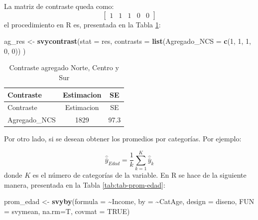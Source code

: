 \documentclass[
  spanish,
  12pt,
]{book}
\newenvironment{Shaded}{\begin{snugshade}}{\end{snugshade}}
\newcommand{\AttributeTok}[1]{\textcolor[rgb]{0.13,0.29,0.53}{#1}}
\newcommand{\ConstantTok}[1]{\textcolor[rgb]{0.56,0.35,0.01}{#1}}
\newcommand{\DecValTok}[1]{\textcolor[rgb]{0.00,0.00,0.81}{#1}}
\newcommand{\FunctionTok}[1]{\textcolor[rgb]{0.13,0.29,0.53}{\textbf{#1}}}
\newcommand{\NormalTok}[1]{#1}
\newcommand{\OtherTok}[1]{\textcolor[rgb]{0.56,0.35,0.01}{#1}}
\newcommand{\SpecialCharTok}[1]{\textcolor[rgb]{0.81,0.36,0.00}{\textbf{#1}}}
\begin{document}
La matriz de contraste queda como:
\[
\left[\begin{array}{cccccc}
1 & 1 & 1 & 0 & 0
\end{array}\right]
\]
el procedimiento en R es, presentada en la Tabla \ref{tab:tab-contraste-ncs}:

\begin{Shaded}
\begin{Highlighting}[]
\NormalTok{ag\_res }\OtherTok{\textless{}{-}} \FunctionTok{svycontrast}\NormalTok{(}\AttributeTok{stat =}\NormalTok{ res,}
                      \AttributeTok{contrasts =} \FunctionTok{list}\NormalTok{(}\AttributeTok{Agregado\_NCS =} \FunctionTok{c}\NormalTok{(}\DecValTok{1}\NormalTok{, }\DecValTok{1}\NormalTok{, }\DecValTok{1}\NormalTok{, }\DecValTok{0}\NormalTok{, }\DecValTok{0}\NormalTok{))}
\NormalTok{                      )}
\end{Highlighting}
\end{Shaded}

\begin{longtable}[]{@{}lcc@{}}
\caption{\label{tab:tab-contraste-ncs}Contraste agregado Norte, Centro y Sur}\tabularnewline
\toprule\noalign{}
Contraste & Estimacion & SE \\
\midrule\noalign{}
\endfirsthead
\toprule\noalign{}
Contraste & Estimacion & SE \\
\midrule\noalign{}
\endhead
\bottomrule\noalign{}
\endlastfoot
Agregado\_NCS & 1829 & 97.3 \\
\end{longtable}

Por otro lado, si se desean obtener los promedios por categorías. Por ejemplo:

\[
\hat{\bar{y}}_{Edad} = \frac{1}{k}\sum_{k=1}^K\hat{\bar{y}}_{k}
\]
donde \(K\) es el número de categorías de la variable. En R se hace de la siguiente manera, presentada en la Tabla \ref{tab:tab-prom-edad}:

\begin{Shaded}
\begin{Highlighting}[]
\NormalTok{prom\_edad }\OtherTok{\textless{}{-}} \FunctionTok{svyby}\NormalTok{(}\AttributeTok{formula =} \SpecialCharTok{\textasciitilde{}}\NormalTok{Income,}
                   \AttributeTok{by =} \SpecialCharTok{\textasciitilde{}}\NormalTok{CatAge,}
                   \AttributeTok{design =}\NormalTok{  diseno,}
                   \AttributeTok{FUN =}\NormalTok{ svymean,}
                   \AttributeTok{na.rm=}\NormalTok{T,}
                   \AttributeTok{covmat =} \ConstantTok{TRUE}\NormalTok{)}
\end{Highlighting}
\end{Shaded}
\end{document}
